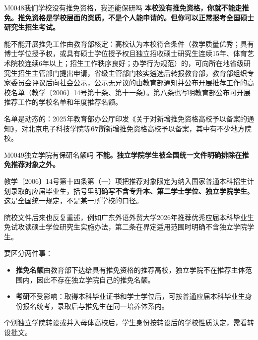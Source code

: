\begin{qa}{M0048}{我们学校没有推免资格，我还能保研吗}
\textbf{本校没有推免资格，你就不能走推免。推免资格是学校层面的资质，不是个人能申请的。但你可以正常报考全国硕士研究生招生考试。}

能不能开展推免工作由教育部核定：高校认为本校符合条件（教学质量优秀；具有博士学位授予权，或具有硕士学位授予权且独立招收硕士研究生连续15年、体育艺术院校连续6年以上；招生工作秩序良好；办学行为规范）的，可向所在地省级研究生招生主管部门提出申请，省级主管部门核实遴选后转报教育部，教育部组织专家委员会评议后向社会公示，公示无异议的由教育部通知并公布开展推荐工作的高校名单（教学〔2006〕14号第十条、第十一条）。第八条也写明教育部公布可开展推荐工作的学校名单和年度推荐名额。

名单是动态的：2025年教育部办公厅印发《关于对新增推免资格高校予以备案的通知》，对北京电子科技学院等\textbf{67所}新增推免资格高校予以备案，其中有不少地方院校。
\end{qa}

\begin{qa}{M0049}{独立学院有保研名额吗}
\textbf{不能。独立学院学生被全国统一文件明确排除在推免推荐对象之外。}

教学〔2006〕14号第十四条第（一）项把推荐对象限定为纳入国家普通本科招生计划录取的应届毕业生，括号里明确写\textbf{不含专升本、第二学士学位、独立学院学生}。这是全国统一规定，不是某一所学校的口径。

院校文件后来也反复重述，例如广东外语外贸大学2026年推荐优秀应届本科毕业生免试攻读硕士学位研究生实施办法，第二条在界定适用范围时明确不含独立学院学生。

要区分两件事：

\begin{itemize}
  \item \textbf{推免名额}由教育部下达给具有推免资格的推荐高校，独立学院不在推荐主体范围内，因此不存在独立学院自己的推免名额。
  \item \textbf{考研}不受影响：取得本科毕业证书和学士学位后，可按普通应届本科毕业生身份报名统考，录取后与推免生在同一培养体系内。
\end{itemize}

个别独立学院转设或并入母体高校后，学生身份按转设后的学校性质认定，需看转设批文。
\end{qa}

